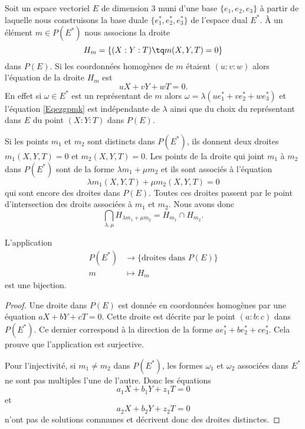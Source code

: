 Soit un espace vectoriel \( E\) de dimension \( 3\) muni d'une base \( \{ e_1,e_2,e_3 \}\) à partir de laquelle nous construisons la base duale \( \{ e_1^*,e_2^*,e_3^* \}\) de l'espace dual \( E^*\). À un élément \( m\in P(E^*)\) nous associons la droite
\begin{equation}
	H_m=\{ (X:Y:T)\tq m(X,Y,T)=0 \}
\end{equation}
dans \( P(E)\). Si les coordonnées homogènes de \( m\) étaient \( (u:v:w)\) alors l'équation de la droite \( H_m\) est
\begin{equation}    \label{Eqezgpmk}
	uX+vY+wT=0.
\end{equation}
En effet si \( \omega\in E^*\) est un représentant de \( m\) alors \( \omega=\lambda(ue_1^*+ve_2^*+we_3^*)\) et l'équation \eqref{Eqezgpmk} est indépendante de \( \lambda\) ainsi que du choix du représentant dans \( E\) du point \( (X:Y:T)\) dans \( P(E)\).

Si les points \( m_1\) et \( m_2\) sont distincts dans \( P(E^*)\), ils donnent deux droites \( m_1(X,Y,T)=0\) et \( m_2(X,Y,T)=0\). Les points de la droite qui joint \( m_1\) à \( m_2\) dans \( P(E^*)\) sont de la forme \( \lambda m_1+\mu m_2\) et ils sont associés à l'équation
\begin{equation}
	\lambda m_1(X,Y,T)+\mu m_2(X,Y,T)=0
\end{equation}
qui sont encore des droites dans \( P(E)\). Toutes ces droites passent par le point d'intersection des droits associées à \( m_1\) et \( m_2\). Nous avons donc
\begin{equation}
	\bigcap_{\lambda,\mu}H_{\lambda m_1+\mu m_2}=H_{m_1}\cap H_{m_2}.
\end{equation}

\begin{lemma}
	L'application
	\begin{equation}
		\begin{aligned}
			P(E^*) & \to \{ \text{droites dans } P(E) \} \\
			m      & \mapsto H_m
		\end{aligned}
	\end{equation}
	est une bijection.
\end{lemma}

\begin{proof}
	Une droite dans \( P(E)\) est donnée en coordonnées homogènes par une équation \( aX+bY+cT=0\). Cette droite est décrite par le point \( (a:b:c)\) dans \( P(E^*)\). Ce dernier correspond à la direction de la forme \( ae_1^*+be_2^*+ce_3^*\). Cela prouve que l'application est surjective.

	Pour l'injectivité, si \( m_1\neq m_2\) dans \( P(E^*)\), les formes \( \omega_1\) et \( \omega_2\) associées dans \( E^*\) ne sont pas multiples l'une de l'autre. Donc les équations
	\begin{equation}
		a_1X+b_1Y+z_1T=0
	\end{equation}
	et
	\begin{equation}
		a_2X+b_2Y+z_2T=0
	\end{equation}
	n'ont pas de solutions communes et décrivent donc des droites distinctes.
\end{proof}

